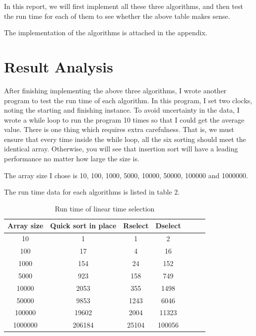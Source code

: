 \documentclass{article}
\begin{document}
\begin{spacing}{2.0}
In this report, we will first implement all these three algorithms, and then test the run time for each of them to see whether the above table makes sense.

The implementation of the algorithms is attached in the appendix.
\section{Result Analysis}
\indent After finishing implementing the above three algorithms, I wrote another program to test the run time of each algorithm. In this program, I set two clocks, noting the starting and finishing instance. To avoid uncertainty in the data, I wrote a while loop to run the program 10 times so that I could get the average value. There is one thing which requires extra carefulness. That is, we must ensure that every time inside the while loop, all the six sorting should meet the identical array. Otherwise, you will see that insertion sort will have a leading performance no matter how large the size is.

The array size I chose is 10, 100, 1000, 5000, 10000, 50000, 100000 and 1000000.

The run time data for each algorithms is listed in table 2.
\begin{table}[!h]
\centering
\begin{tabular}{c|cccccc}
Array size&Quick sort in place&Rselect&Dselect\\
\hline
\hline
10&1&1&2\\
\hline
100&17&4&16\\
\hline
1000&154&24&152\\
\hline
5000&923&158&749\\
\hline
10000&2053&355&1498\\
\hline
50000&9853&1243&6046\\
\hline
100000&19602&2004&11323\\
\hline
1000000&206184&25104&100056\\
\hline
\end{tabular}
\caption{Run time of linear time selection}
\end{table}


\end{spacing}
\end{document}
